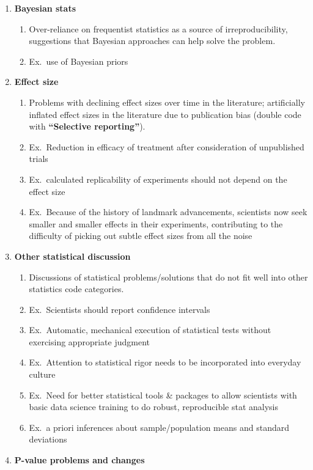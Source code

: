 \documentclass[
]{scrartcl}
\begin{document}
\begin{enumerate}
  \begin{enumerate}

  \item
    \textbf{Bayesian stats}

    \begin{enumerate}
    
    \item
      Over-reliance on frequentist statistics as a source of
      irreproducibility, suggestions that Bayesian approaches can help
      solve the problem.
    \item
      Ex.~use of Bayesian priors
    \end{enumerate}
  \item
    \textbf{Effect size}

    \begin{enumerate}
    
    \item
      Problems with declining effect sizes over time in the literature;
      artificially inflated effect sizes in the literature due to
      publication bias (double code with \textbf{``Selective
      reporting''}).
    \item
      Ex.~Reduction in efficacy of treatment after consideration of
      unpublished trials
    \item
      Ex.~calculated replicability of experiments should not depend on
      the effect size
    \item
      Ex.~Because of the history of landmark advancements, scientists
      now seek smaller and smaller effects in their experiments,
      contributing to the difficulty of picking out subtle effect sizes
      from all the noise
    \end{enumerate}
  \item
    \textbf{Other statistical discussion}

    \begin{enumerate}
    
    \item
      Discussions of statistical problems/solutions that do not fit well
      into other statistics code categories.
    \item
      Ex.~Scientists should report confidence intervals
    \item
      Ex.~Automatic, mechanical execution of statistical tests without
      exercising appropriate judgment
    \item
      Ex.~Attention to statistical rigor needs to be incorporated into
      everyday culture
    \item
      Ex.~Need for better statistical tools \& packages to allow
      scientists with basic data science training to do robust,
      reproducible stat analysis
    \item
      Ex.~a priori inferences about sample/population means and standard
      deviations
    \end{enumerate}
  \item
    \textbf{P-value problems and changes}


\end{enumerate}
\end{enumerate}
\end{document}
